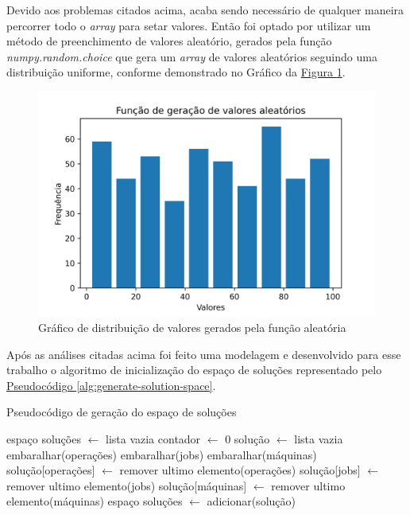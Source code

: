 \noindent Devido aos problemas citados acima, acaba sendo necessário de qualquer maneira percorrer todo o \textit{array} para setar valores. \newline 
Então foi optado por utilizar um método de preenchimento de valores aleatório, 
gerados pela função \textit{numpy.random.choice} que gera um \textit{array} de valores aleatórios seguindo uma distribuição uniforme, 
conforme demonstrado no Gráfico da \hyperref[fig:distrib-uniforme]{Figura \ref{fig:distrib-uniforme}}.

\begin{figure}[ht]
    \centering
    \caption{Gráfico de distribuição de valores gerados pela função aleatória}
    \label{fig:distrib-uniforme}
    \includegraphics[width=\textwidth]{assets/hist_uniform.png}
\end{figure}

%

Após as análises citadas acima foi feito uma modelagem e desenvolvido para esse trabalho o algoritmo de inicialização do espaço de soluções representado pelo 
\hyperref[alg:generate-solution-space]{Pseudocódigo \ref{alg:generate-solution-space}}.\\
\begin{algorithm}
\caption{Pseudocódigo de geração do espaço de soluções}\label{alg:generate-solution-space}
\begin{algorithmic}
\State espaço soluções $\gets$ lista vazia
\State contador  $\gets$ 0
  \State solução $\gets$ lista vazia
  \State embaralhar(operações)
  \State embaralhar(jobs)
  \State embaralhar(máquinas)
  \State solução[operações] $\gets$ remover ultimo elemento(operações)
  \State solução[jobs] $\gets$ remover ultimo elemento(jobs)
  \State solução[máquinas] $\gets$ remover ultimo elemento(máquinas)
  \State espaço soluções $\gets$ adicionar(solução)
\EndWhile
\end{algorithmic}
\end{algorithm}
